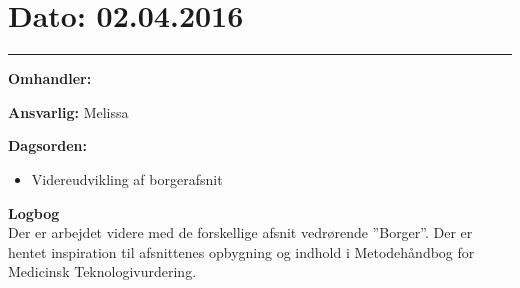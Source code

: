 \section{Dato: 02.04.2016}
\hrule

\textbf{Omhandler:}

\textbf{Ansvarlig:} Melissa

\textbf{Dagsorden:}
\begin{itemize}
	\item Videreudvikling af borgerafsnit
\end{itemize}

\textbf{Logbog}
\\
Der er arbejdet videre med de forskellige afsnit vedrørende ”Borger”. Der er hentet inspiration til afsnittenes opbygning og indhold i Metodehåndbog for Medicinsk Teknologivurdering. 
\\ \\



